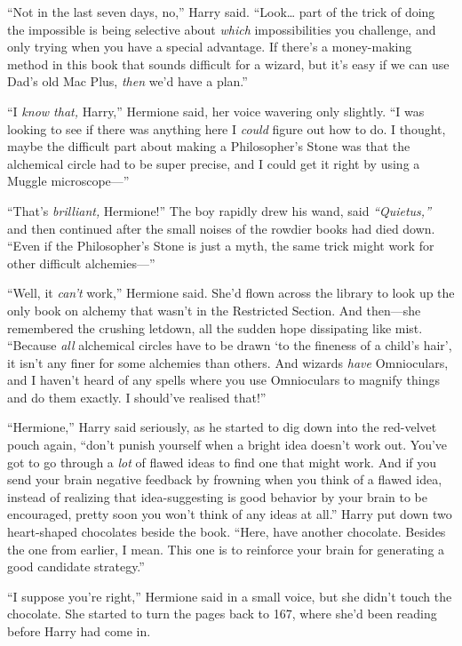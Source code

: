 ``Not in the last seven days, no,'' Harry said. ``Look\ldots{} part of
the trick of doing the impossible is being selective about \emph{which}
impossibilities you challenge, and only trying when you have a special
advantage. If there's a money-making method in this book that sounds
difficult for a wizard, but it's easy if we can use Dad's old Mac Plus,
\emph{then} we'd have a plan.''

``I \emph{know that,} Harry,'' Hermione said, her voice wavering only
slightly. ``I was looking to see if there was anything here I
\emph{could} figure out how to do. I thought, maybe the difficult part
about making a Philosopher's Stone was that the alchemical circle had to
be super precise, and I could get it right by using a Muggle
microscope---''

``That's \emph{brilliant,} Hermione!'' The boy rapidly drew his wand,
said \emph{``Quietus,''} and then continued after the small noises of
the rowdier books had died down. ``Even if the Philosopher's Stone is
just a myth, the same trick might work for other difficult
alchemies---''

``Well, it \emph{can't} work,'' Hermione said. She'd flown across the
library to look up the only book on alchemy that wasn't in the
Restricted Section. And then---she remembered the crushing letdown, all
the sudden hope dissipating like mist. ``Because \emph{all} alchemical
circles have to be drawn `to the fineness of a child's hair', it isn't
any finer for some alchemies than others. And wizards \emph{have}
Omnioculars, and I haven't heard of any spells where you use Omnioculars
to magnify things and do them exactly. I should've realised that!''

``Hermione,'' Harry said seriously, as he started to dig down into the
red-velvet pouch again, ``don't punish yourself when a bright idea
doesn't work out. You've got to go through a \emph{lot} of flawed ideas
to find one that might work. And if you send your brain negative
feedback by frowning when you think of a flawed idea, instead of
realizing that idea-suggesting is good behavior by your brain to be
encouraged, pretty soon you won't think of any ideas at all.'' Harry put
down two heart-shaped chocolates beside the book. ``Here, have another
chocolate. Besides the one from earlier, I mean. This one is to
reinforce your brain for generating a good candidate strategy.''

``I suppose you're right,'' Hermione said in a small voice, but she
didn't touch the chocolate. She started to turn the pages back to 167,
where she'd been reading before Harry had come in.

